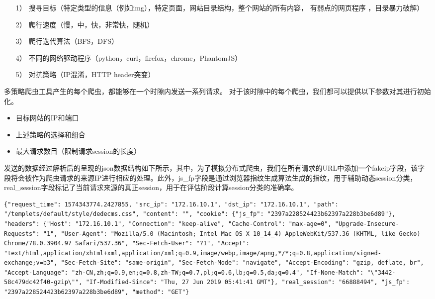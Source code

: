\documentclass[doctor,privacy,twoside]{buaa_mac}
\begin{document}
\begin{itemize}
\item[1）] 搜寻目标（特定类型的信息（例如img），特定页面，网站目录结构，整个网站的所有内容， 有弱点的网页程序 ，目录暴力破解）
\item[2）] 爬行速度（慢，中，快，非常快，随机）
\item[3）] 爬行迭代算法（BFS，DFS）
\item[4）] 不同的网络驱动程序（python，curl，firefox，chrome，PhantomJS）
\item[5）] 对抗策略（IP混淆，HTTP header突变）
\end {itemize}

多策略爬虫工具产生的每个爬虫，都能够在一个时隙内发送一系列请求。 对于该时隙中的每个爬虫，我们都可以提供以下参数对其进行初始化。

\begin{itemize}
\item 目标网站的IP和端口
\item 上述策略的选择和组合
\item 最大请求数目（限制请求session的长度）
\end {itemize}

发送的数据经过解析后的呈现的json数据结构如下所示，其中，为了模拟分布式爬虫，我们在所有请求的URL中添加一个fakeip字段，该字段将会被作为爬虫请求的来源IP进行相应的处理。此外，js\_{}fp字段是通过浏览器指纹生成算法生成的指纹，用于辅助动态session分类，real\_{}session字段标记了当前请求来源的真正session，用于在评估阶段计算session分类的准确率。
\centerline{}
\lstset{language=JavaScript}
\begin{lstlisting}
{"request_time": 1574343774.2427855, "src_ip": "172.16.10.1", "dst_ip": "172.16.10.1", "path": "/templets/default/style/dedecms.css", "content": "", "cookie": {"js_fp": "2397a228524423b62397a228b3be6d89"}, "headers": {"Host": "172.16.10.1", "Connection": "keep-alive", "Cache-Control": "max-age=0", "Upgrade-Insecure-Requests": "1", "User-Agent": "Mozilla/5.0 (Macintosh; Intel Mac OS X 10_14_4) AppleWebKit/537.36 (KHTML, like Gecko) Chrome/78.0.3904.97 Safari/537.36", "Sec-Fetch-User": "?1", "Accept": "text/html,application/xhtml+xml,application/xml;q=0.9,image/webp,image/apng,*/*;q=0.8,application/signed-exchange;v=b3", "Sec-Fetch-Site": "same-origin", "Sec-Fetch-Mode": "navigate", "Accept-Encoding": "gzip, deflate, br", "Accept-Language": "zh-CN,zh;q=0.9,en;q=0.8,zh-TW;q=0.7,pl;q=0.6,lb;q=0.5,da;q=0.4", "If-None-Match": "\"3442-58c479dc42f40-gzip\"", "If-Modified-Since": "Thu, 27 Jun 2019 05:41:41 GMT"}, "real_session": "66888494", "js_fp": "2397a228524423b62397a228b3be6d89", "method": "GET"}
\end{lstlisting}
\end{document}

